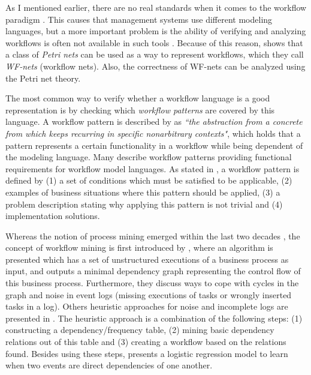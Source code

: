\documentclass[a4paper,11pt]{article}
\begin{document}
As I mentioned earlier, there are no real standards when it comes to the workflow paradigm \cite{VanderAalst1997}. This causes that management systems use different modeling languages, but a more important problem is the ability of verifying and analyzing workflows is often not available in such tools \cite{VanderAalst1997}. Because of this reason, \cite{VanderAalst1997} shows that a class of \textit{Petri nets} can be used as a way to represent workflows, which they call \textit{WF-nets} (workflow nets). Also, the correctness of WF-nets can be analyzed using the Petri net theory. 


The most common way to verify whether a workflow language is a good representation is by checking which \textit{workflow patterns} are covered by this language. A workflow pattern is described by \cite{Riehle1996} as \textit{``the abstraction from a concrete from which keeps recurring in specific nonarbitrary contexts"}, which holds that a pattern represents a certain functionality in a workflow while being dependent of the modeling language. Many \cite{VanderAalst2003Patterns,Dijkstra2003ControlPatterns,Russell2004DataPatterns,Russell2005ResourcePatterns,Russell2006ExceptionPatterns} describe workflow patterns providing functional requirements for workflow model languages. As stated in \cite{VanderAalst2003Patterns,Dijkstra2003ControlPatterns,Russell2004DataPatterns,Russell2005ResourcePatterns,Russell2006ExceptionPatterns}, a workflow pattern is defined by (1) a set of conditions which must be satisfied to be applicable, (2) examples of business situations where this pattern should be applied, (3) a problem description stating why applying this pattern is not trivial and (4) implementation solutions.

Whereas the notion of process mining emerged within the last two decades \cite{VanderAalst2003}, the concept of workflow mining is first introduced by \cite{Agrawal1998}, where an algorithm is presented which has a set of unstructured executions of a business process as input, and outputs a minimal dependency graph representing the control flow of this business process. Furthermore, they discuss ways to cope with cycles in the graph and noise in event logs (missing executions of tasks or wrongly inserted tasks in a log). Others heuristic approaches for noise and incomplete logs are presented in \cite{Maruster2002,Weijters2001,Weijters}. The heuristic approach \cite{Weijters2001,Weijters} is a combination of the following steps: (1) constructing a dependency/frequency table, (2) mining basic dependency relations out of this table and (3) creating a workflow based on the relations found. Besides using these steps, \cite{Maruster2002} presents a logistic regression model to learn when two events are direct dependencies of one another. 
\end{document}
